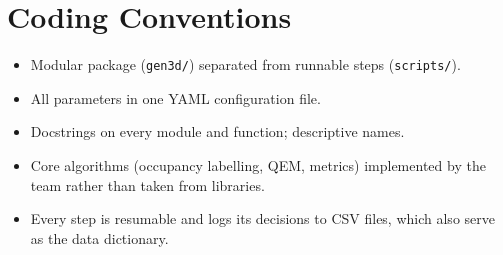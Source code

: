 \section{Coding Conventions}
\begin{itemize}[leftmargin=*]
  \item Modular package (\texttt{gen3d/}) separated from runnable steps (\texttt{scripts/}).
  \item All parameters in one YAML configuration file.
  \item Docstrings on every module and function; descriptive names.
  \item Core algorithms (occupancy labelling, QEM, metrics) implemented by the team rather than taken from libraries.
  \item Every step is resumable and logs its decisions to CSV files, which also serve as the data dictionary.
\end{itemize}
